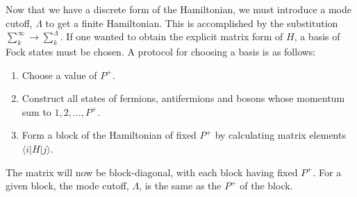 Now that we have a discrete form of the Hamiltonian, we must introduce a mode cutoff, $\Lambda$ to get a finite Hamiltonian.
This is accomplished by the substitution $\sum_k^\infty \rightarrow \sum_k^\Lambda$.
If one wanted to obtain the explicit matrix form of $H$, a basis of Fock states must be chosen. 
A protocol for choosing a basis is as follows:

\begin{enumerate}
    \item Choose a value of $P^+$.
    \item Construct all states of fermions, antifermions and bosons whose momentum sum to $1, 2, \dots, P^+$.
    \item Form a block of the Hamiltonian of fixed $P^+$ by calculating matrix elements $\langle i|H|j\rangle$.
\end{enumerate}

The matrix will now be block-diagonal, with each block having fixed $P^+$.
For a given block, the mode cutoff, $\Lambda$, is the same as the $P^+$ of the block.